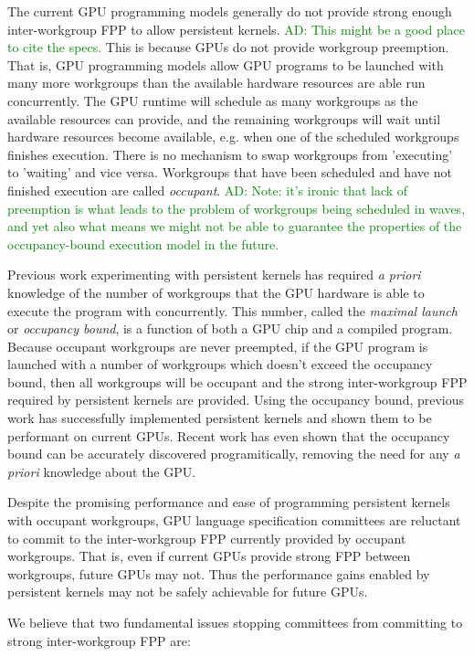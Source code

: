 \documentclass[nocopyrightspace]{sigplanconf-pldi16}
\newcommand{\ADComment}[1]{\textcolor{green}{AD: #1}}
\begin{document}
The current GPU programming models generally do not provide strong
enough inter-workgroup FPP to allow persistent kernels. \ADComment{This might be a good place to cite the specs.}  This is
because GPUs do not provide workgroup preemption. That is, GPU
programming models allow GPU programs to be launched with many more
workgroups than the available hardware resources are able run
concurrently. The GPU runtime will schedule as many workgroups as the
available resources can provide, and the remaining workgroups will
wait until hardware resources become available, e.g.  when one of the
scheduled workgroups finishes execution. There is no mechanism to swap
workgroups from 'executing' to 'waiting' and vice versa. Workgroups
that have been scheduled and have not finished execution are called
\emph{occupant}.  \ADComment{Note: it's ironic that lack of preemption is what leads to the problem of workgroups being scheduled in waves, and yet also what means we might not be able to guarantee the properties of the occupancy-bound execution model in the future.}

Previous work experimenting with persistent kernels has required
\emph{a priori} knowledge of the number of workgroups that the GPU
hardware is able to execute the program with concurrently. This
number, called the \emph{maximal launch} or \emph{occupancy bound}, is
a function of both a GPU chip and a compiled program. Because occupant
workgroups are never preempted, if the GPU program is launched with a
number of workgroups which doesn't exceed the occupancy bound, then
all workgroups will be occupant and the strong inter-workgroup FPP
required by persistent kernels are provided. Using the occupancy
bound, previous work has successfully implemented persistent kernels
and shown them to be performant on current GPUs. Recent work has even
shown that the occupancy bound can be accurately discovered
programitically, removing the need for any \emph{a priori} knowledge
about the GPU.

Despite the promising performance and ease of programming persistent
kernels with occupant workgroups, GPU language specification
committees are reluctant to commit to the inter-workgroup FPP
currently provided by occupant workgroups. That is, even if current
GPUs provide strong FPP between workgroups, future GPUs may not. Thus
the performance gains enabled by persistent kernels may not be
safely achievable for future GPUs.

We believe that two fundamental issues stopping committees from
committing to strong inter-workgroup FPP are:
\end{document}
